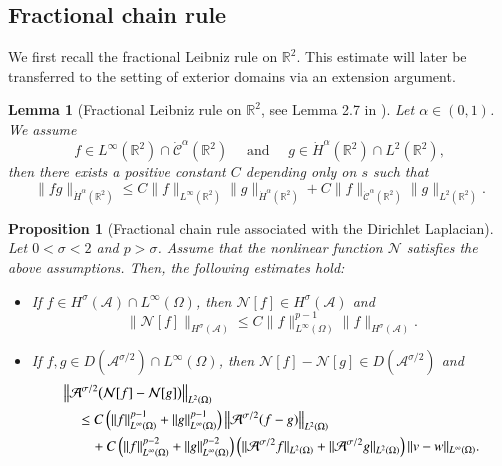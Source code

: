 \documentclass[10pt,a4paper]{amsart}
\newtheorem{lemma}[theorem]{Lemma}
\newtheorem{proposition}[theorem]{Proposition}
\numberwithin{equation}{section}
\begin{document}
\subsection{Fractional chain rule}

We first recall the fractional Leibniz rule on $\mathbb R^2$. This estimate will later be transferred to the setting of exterior domains via an extension argument.

\begin{lemma}[Fractional Leibniz rule on $\mathbb R^2$, see Lemma 2.7 in \cite{IkedaInuiWakasugi2026}]
\label{lem:Leibniz}
Let $\alpha\in (0,1)$. We assume
\[
f\in L^\infty(\mathbb R^2)\cap \dot{\mathcal{C}}^\alpha(\mathbb R^2)
\quad\text{ and }\quad
g\in \dot H^\alpha(\mathbb R^2)\cap L^2(\mathbb R^2),
\]
then there exists a positive constant $C$ depending only on $s$ such that
\begin{equation*}
\|fg\|_{\dot H^\alpha(\mathbb R^2)}
\le
C
\|f\|_{L^\infty(\mathbb R^2)}
\|g\|_{\dot H^\alpha(\mathbb R^2)}
+
C
\|f\|_{\dot{\mathcal{C}}^\alpha(\mathbb R^2)}
\|g\|_{L^2(\mathbb R^2)}.
\end{equation*}
\end{lemma}


\begin{proposition}[Fractional chain rule associated with the Dirichlet Laplacian]
\label{prop:chain}
Let $0<\sigma<2$ and $p>\sigma$. Assume that the nonlinear function $\mathcal{N}$ satisfies the above assumptions. Then, the following estimates hold:
\begin{itemize}
    \item[i)] If $f\in H^\sigma(\mathcal{A})\cap L^\infty(\Omega)$, then $\mathcal{N}[f]\in H^\sigma(\mathcal{A})$ and
    \begin{equation}
    \label{eq:chain}
    \big\|\mathcal{N}[f]\big\|_{H^\sigma(\mathcal{A})}
    \le
    C
    \|f\|_{L^\infty(\Omega)}^{p-1}
    \|f\|_{H^\sigma(\mathcal{A})}.
    \end{equation}
    \item[ii)] If $f,g\in D(\mathcal A^{\sigma/2})\cap L^\infty(\Omega)$, then $\mathcal N[f]-\mathcal N[g]\in D(\mathcal A^{\sigma/2})$
and
\begin{align}
&\bigl\|
\mathcal A^{\sigma/2}
\bigl(
\mathcal N[f]-\mathcal N[g]
\bigr)
\bigr\|_{L^2(\Omega)} \notag \\
&\quad\le
C
\left(
\|f\|_{L^\infty(\Omega)}^{p-1}
+
\|g\|_{L^\infty(\Omega)}^{p-1}
\right)
\bigl\|
\mathcal A^{\sigma/2}(f-g)
\bigr\|_{L^2(\Omega)}
\label{eq:Lip-chain-first}\\
&\qquad
+
C
\left(
\|f\|_{L^\infty(\Omega)}^{p-2}
+
\|g\|_{L^\infty(\Omega)}^{p-2}
\right)
\left(
\|\mathcal A^{\sigma/2}f\|_{L^2(\Omega)}
+
\|\mathcal A^{\sigma/2}g\|_{L^2(\Omega)}
\right)
\|v-w\|_{L^\infty(\Omega)}.
\notag
\end{align}
\end{itemize}
\end{proposition}
\end{document}
